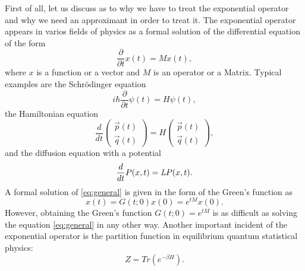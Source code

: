 First of all, let us discuss as to why we have to treat the exponential operator and why we need an approximant in order to treat it. The exponential operator appears in varios fields of physics as a formal solution of the differential equation of the form
\begin{equation} \label{eq:general}
\dfrac{\partial}{\partial t} x(t) = M x(t),
\end{equation}
where $x$ is a function or a vector and $M$ is an operator or a Matrix. Typical examples are the Schr\"odinger equation
\begin{equation}
i\hbar\dfrac{\partial}{\partial t} \psi(t) = H\psi(t),
\end{equation}
the Hamiltonian equation
\begin{equation}
\dfrac{d}{d t} 
\begin{pmatrix}
\vec{p}(t) \\ \vec{q}(t)
\end{pmatrix}
= H
\begin{pmatrix}
\vec{p}(t) \\ \vec{q}(t)
\end{pmatrix},
\end{equation}
and the diffusion equation with a potential
\begin{equation}
\dfrac{d}{dt}P(x,t) = \emph{L} P(x,t).
\end{equation}
A formal solution of \eqref{eq:general} is given in the form of the Green's function as 
\begin{equation}
x(t) = G(t;0)x(0) = e^{tM}x(0).
\end{equation}
However, obtaining the Green's function $G(t;0) = e^{tM}$ is as difficult as solving the equation \eqref{eq:general} in any other way. Another important incident of the exponential operator is the partition function in equilibrium quantum statistical physics:
\begin{equation}
Z = Tr(e^{- \beta H}).
\end{equation}

